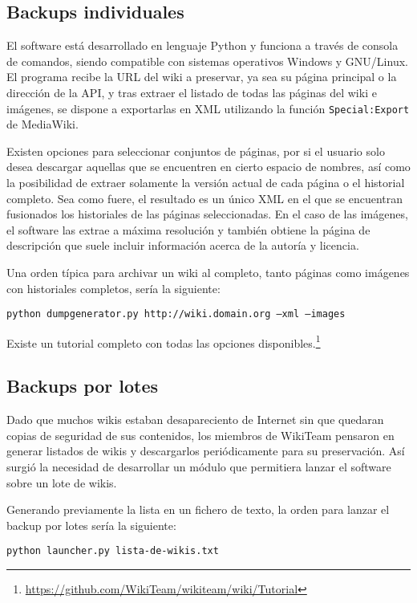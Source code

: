 \documentclass[14pt,twocolumn]{article}
\begin{document}
\subsection{Backups individuales}

El software está desarrollado en lenguaje Python y funciona a través de consola de comandos, siendo compatible con sistemas operativos Windows y GNU/Linux. El programa recibe la URL del wiki a preservar, ya sea su página principal o la dirección de la API, y tras extraer el listado de todas las páginas del wiki e imágenes, se dispone a exportarlas en XML  utilizando la función {\tt Special:Export} de MediaWiki.

Existen opciones para seleccionar conjuntos de páginas, por si el usuario solo desea descargar aquellas que se encuentren en cierto espacio de nombres, así como la posibilidad de extraer solamente la versión actual de cada página o el historial completo. Sea como fuere, el resultado es un único XML en el que se encuentran fusionados los historiales de las páginas seleccionadas. En el caso de las imágenes, el software las extrae a máxima resolución y también obtiene la página de descripción que suele incluir información acerca de la autoría y licencia.

Una orden típica para archivar un wiki al completo, tanto páginas como imágenes con historiales completos, sería la siguiente:

{\tt python dumpgenerator.py http://wiki.domain.org --xml --images}

Existe un tutorial completo con todas las opciones disponibles.\footnote{\href{https://github.com/WikiTeam/wikiteam/wiki/Tutorial}{https://github.com/WikiTeam/wikiteam/wiki/Tutorial}}

\subsection{Backups por lotes}

Dado que muchos wikis estaban desapareciento de Internet sin que quedaran copias de seguridad de sus contenidos, los miembros de WikiTeam pensaron en generar listados de wikis y descargarlos periódicamente para su preservación. Así surgió la necesidad de desarrollar un módulo que permitiera lanzar el software sobre un lote de wikis.

Generando previamente la lista en un fichero de texto, la orden para lanzar el backup por lotes sería la siguiente:

{\tt python launcher.py lista-de-wikis.txt}
\end{document}
